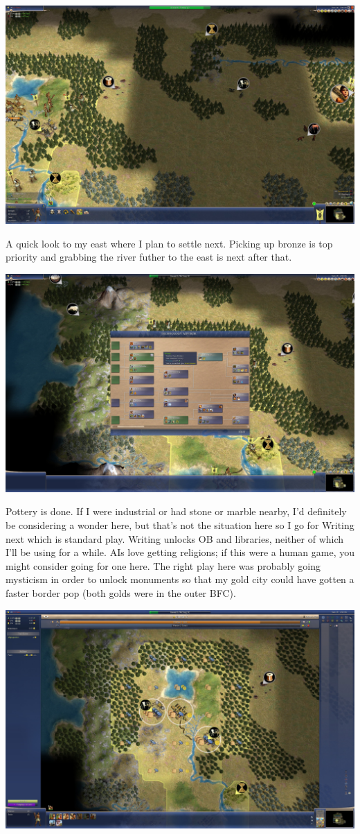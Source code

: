 \documentclass[10pt]{article}
\begin{document}
\includegraphics[width=1.0\textwidth]{16}

A quick look to my east where I plan to settle next. Picking up bronze is top priority and grabbing the
river futher to the east is next after that.

\includegraphics[width=1.0\textwidth]{17}

Pottery is done. If I were industrial or had stone or marble nearby, I'd definitely be considering a wonder
here, but that's not the situation here so I go for Writing next which is standard play. Writing unlocks
OB and libraries, neither of which I'll be using for a while. AIs love getting religions; if this were a human
game, you might consider going for one here. The right play here was probably going mysticism in order to unlock
monuments so that my gold city could have gotten a faster border pop (both golds were in the outer BFC).

\includegraphics[width=1.0\textwidth]{18}
\end{document}
